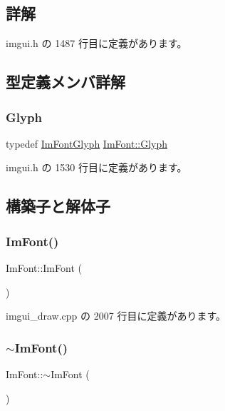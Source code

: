 \subsection{詳解}


 imgui.\+h の 1487 行目に定義があります。



\subsection{型定義メンバ詳解}
\mbox{\label{struct_im_font_a4b802233ac8d3f3beddc395837288683}} 
\subsubsection{\texorpdfstring{Glyph}{Glyph}}
{\footnotesize\ttfamily typedef \mbox{\hyperlink{struct_im_font_glyph}{Im\+Font\+Glyph}} \mbox{\hyperlink{struct_im_font_a4b802233ac8d3f3beddc395837288683}{Im\+Font\+::\+Glyph}}}



 imgui.\+h の 1530 行目に定義があります。



\subsection{構築子と解体子}
\mbox{\label{struct_im_font_a1d35b1eb7c2f6a3a648308531e88e7f1}} 
\subsubsection{\texorpdfstring{Im\+Font()}{ImFont()}}
{\footnotesize\ttfamily Im\+Font\+::\+Im\+Font (\begin{DoxyParamCaption}{ }\end{DoxyParamCaption})}



 imgui\+\_\+draw.\+cpp の 2007 行目に定義があります。

\mbox{\label{struct_im_font_a377366ed7c5d076363ad4760aeff63ec}} 
\subsubsection{\texorpdfstring{$\sim$\+Im\+Font()}{~ImFont()}}
{\footnotesize\ttfamily Im\+Font\+::$\sim$\+Im\+Font (\begin{DoxyParamCaption}{ }\end{DoxyParamCaption})}




